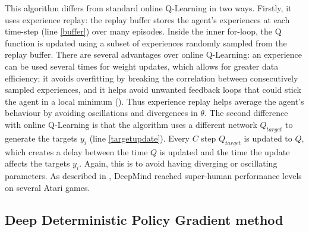 This algorithm differs from standard online Q-Learning in two ways. Firstly, it uses experience replay: the replay buffer stores the agent's experiences at each time-step (line \ref{buffer}) over many episodes. Inside the inner for-loop, the Q function is updated using a subset of experiences randomly sampled from the replay buffer. There are several advantages over online Q-Learning: an experience can be used several times for weight updates, which allows for greater data efficiency; it avoids overfitting by breaking the correlation between consecutively sampled experiences, and it helps avoid unwanted feedback loops that could stick the agent in a local minimum (\cite{temporaldiff}). Thus experience replay helps average the agent's behaviour by avoiding oscillations and divergences in $\theta$. \newline
The second difference with online Q-Learning is that the algorithm uses a different network $Q_{target}$ to generate the targets $y_i$ (line \ref{targetupdate}). Every $C$ step $Q_{target}$ is updated to $Q$, which creates a delay between the time $Q$ is updated and the time the update affects the targets $y_i$. Again, this is to avoid having diverging or oscillating parameters. As described in \cite{drl}, DeepMind reached super-human performance levels on several Atari games.

\subsection{Deep Deterministic Policy Gradient method}
\label{ddpgsection}
		
